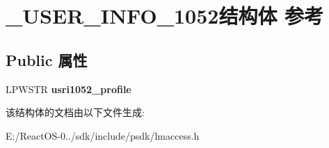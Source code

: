 \hypertarget{struct___u_s_e_r___i_n_f_o__1052}{}\section{\+\_\+\+U\+S\+E\+R\+\_\+\+I\+N\+F\+O\+\_\+1052结构体 参考}
\label{struct___u_s_e_r___i_n_f_o__1052}
\subsection*{Public 属性}
\begin{DoxyCompactItemize}
\item 
\mbox{\label{struct___u_s_e_r___i_n_f_o__1052_a5ed21cc904a833a4900a20c2ad1788c8}} 
L\+P\+W\+S\+TR {\bfseries usri1052\+\_\+profile}
\end{DoxyCompactItemize}


该结构体的文档由以下文件生成\+:\begin{DoxyCompactItemize}
\item 
E\+:/\+React\+O\+S-\/0../sdk/include/psdk/lmaccess.\+h\end{DoxyCompactItemize}
